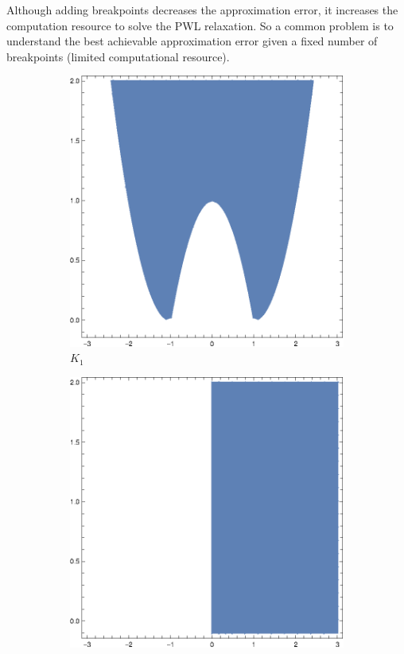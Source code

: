 Although adding breakpoints decreases the approximation error, it increases the computation resource to solve the PWL relaxation. So a common problem is to understand the best achievable approximation error given a fixed number of breakpoints (limited computational resource).



\begin{figure}


 \centering
  \centering
 \begin{subfigure}[b]{0.19\textwidth}
         \centering
         \includegraphics[width=\textwidth]{Chapter2/media/K1.eps}
         \caption{$K_1$}
        \label{fig.pwl.K1}
 \end{subfigure}
  \hfill
 \begin{subfigure}[b]{0.19\textwidth}
         \centering
         \includegraphics[width=\textwidth]{Chapter2/media/K2.eps}

\end{subfigure}
\end{figure}
